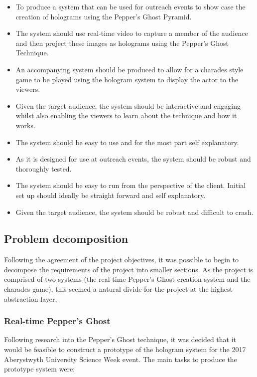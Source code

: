 \begin{itemize}
	\item To produce a system that can be used for outreach events to show case the creation of holograms using the Pepper's Ghost Pyramid.
	
	\item The system should use real-time video to capture a member of the audience and then project these images as holograms using the Pepper's Ghost Technique.
	
	\item An accompanying system should be produced to allow for a charades style game to be played using the hologram system to display the actor to the viewers.
	
	\item Given the target audience, the system should be interactive and engaging whilst also enabling the viewers to learn about the technique and how it works.
	
	\item The system should be easy to use and for the most part self explanatory.
	
	\item As it is designed for use at outreach events, the system should be robust and thoroughly tested.
	
	\item The system should be easy to run from the perspective of the client. Initial set up should ideally be straight forward and self explanatory.
	
	\item Given the target audience, the system should be robust and difficult to crash.
\end{itemize}


\subsection{Problem decomposition}
Following the agreement of the project objectives, it was possible to begin to decompose the requirements of the project into smaller sections. As the project is comprised of two systems (the real-time Pepper's Ghost creation system and the charades game), this seemed a natural divide for the project at the highest abstraction layer.

\subsubsection{Real-time Pepper's Ghost}
Following research into the Pepper's Ghost technique, it was decided that it would be feasible to construct a prototype of the hologram system for the 2017 Aberystwyth University Science Week event. The main tasks to produce the prototype system were:

